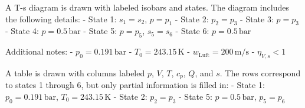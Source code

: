 A T-s diagram is drawn with labeled isobars and states. The diagram includes the following details:  
- State 1: \( s_1 = s_2 \), \( p = p_1 \)  
- State 2: \( p_2 = p_3 \)  
- State 3: \( p = p_3 \)  
- State 4: \( p = 0.5 \, \text{bar} \)  
- State 5: \( p = p_5 \), \( s_5 = s_6 \)  
- State 6: \( p = 0.5 \, \text{bar} \)  

Additional notes:  
- \( p_0 = 0.191 \, \text{bar} \)  
- \( T_0 = 243.15 \, \text{K} \)  
- \( w_{\text{Luft}} = 200 \, \text{m/s} \)  
- \( \eta_{V,s} < 1 \)  

A table is drawn with columns labeled \( p \), \( V \), \( T \), \( c_p \), \( Q \), and \( s \). The rows correspond to states 1 through 6, but only partial information is filled in:  
- State 1: \( p_0 = 0.191 \, \text{bar} \), \( T_0 = 243.15 \, \text{K} \)  
- State 2: \( p_2 = p_3 \)  
- State 5: \( p = 0.5 \, \text{bar} \), \( p_5 = p_6 \)